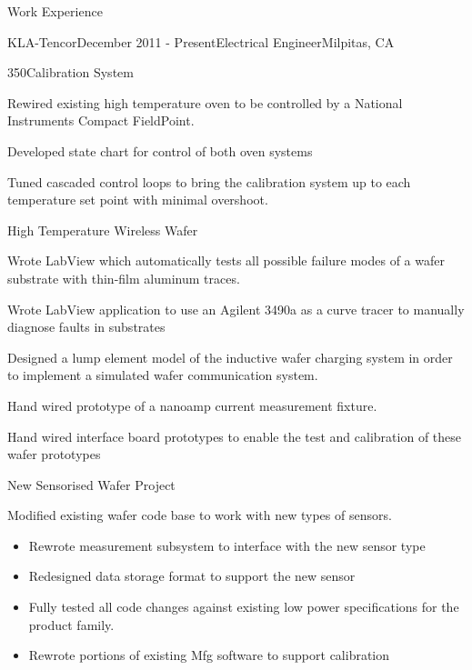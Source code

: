 \documentclass{resume} %
\begin{document}

\begin{rSection}{Work Experience}

\begin{rSubsection}{KLA-Tencor}{December 2011 - Present}{Electrical Engineer}{Milpitas, CA}

\begin{rWorkProject}{350\celsius \space Calibration System}
\item Rewired existing high temperature oven to be controlled by a National Instruments Compact FieldPoint.
\item Developed state chart for control of both oven systems
\item Tuned cascaded control loops to bring the calibration system up to each temperature set point with minimal overshoot.
\end{rWorkProject}

\begin{rWorkProject}{High Temperature Wireless Wafer}
\item Wrote LabView which automatically tests all possible failure modes of a wafer substrate with thin-film aluminum traces.
\item Wrote LabView application to use an Agilent 3490a as a curve tracer to manually diagnose faults in substrates
\item Designed a lump element model of the inductive wafer charging system in order to implement a simulated wafer communication system.
\item Hand wired prototype of a nanoamp current measurement fixture.
\item Hand wired interface board prototypes to enable the test and calibration of these wafer prototypes
\end{rWorkProject}

\begin{rWorkProject}{New Sensorised Wafer Project}
\item Modified existing wafer code base to work with new types of sensors.
\begin{itemize}
\itemsep -0.5em \vspace{-0.5em}
\renewcommand{\labelitemi}{-}
\item Rewrote measurement subsystem to interface with the new sensor type
\item Redesigned data storage format to support the new sensor
\item Fully tested all code changes against existing low power specifications for the product family.
\item Rewrote portions of existing Mfg software to support calibration
\end{itemize}


\end{rWorkProject}
\end{rSubsection}
\end{rSection}
\end{document}
